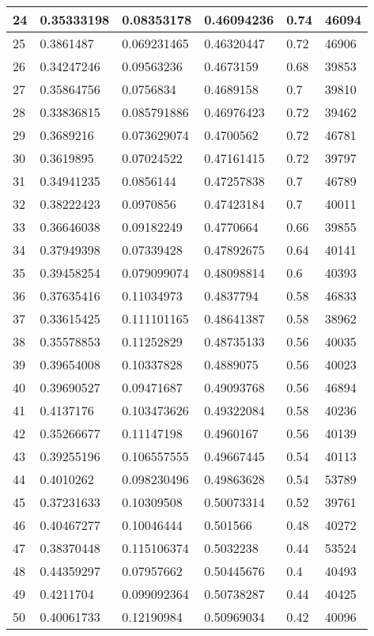 \begin{longtable}{|l|l|l|l|l|l|}
24 & 0.35333198 & 0.08353178 & 0.46094236 & 0.74 & 46094 \\ \hline 
25 & 0.3861487 & 0.069231465 & 0.46320447 & 0.72 & 46906 \\ \hline 
26 & 0.34247246 & 0.09563236 & 0.4673159 & 0.68 & 39853 \\ \hline 
27 & 0.35864756 & 0.0756834 & 0.4689158 & 0.7 & 39810 \\ \hline 
28 & 0.33836815 & 0.085791886 & 0.46976423 & 0.72 & 39462 \\ \hline 
29 & 0.3689216 & 0.073629074 & 0.4700562 & 0.72 & 46781 \\ \hline 
30 & 0.3619895 & 0.07024522 & 0.47161415 & 0.72 & 39797 \\ \hline 
31 & 0.34941235 & 0.0856144 & 0.47257838 & 0.7 & 46789 \\ \hline 
32 & 0.38222423 & 0.0970856 & 0.47423184 & 0.7 & 40011 \\ \hline 
33 & 0.36646038 & 0.09182249 & 0.4770664 & 0.66 & 39855 \\ \hline 
34 & 0.37949398 & 0.07339428 & 0.47892675 & 0.64 & 40141 \\ \hline 
35 & 0.39458254 & 0.079099074 & 0.48098814 & 0.6 & 40393 \\ \hline 
36 & 0.37635416 & 0.11034973 & 0.4837794 & 0.58 & 46833 \\ \hline 
37 & 0.33615425 & 0.111101165 & 0.48641387 & 0.58 & 38962 \\ \hline 
38 & 0.35578853 & 0.11252829 & 0.48735133 & 0.56 & 40035 \\ \hline 
39 & 0.39654008 & 0.10337828 & 0.4889075 & 0.56 & 40023 \\ \hline 
40 & 0.39690527 & 0.09471687 & 0.49093768 & 0.56 & 46894 \\ \hline 
41 & 0.4137176 & 0.103473626 & 0.49322084 & 0.58 & 40236 \\ \hline 
42 & 0.35266677 & 0.11147198 & 0.4960167 & 0.56 & 40139 \\ \hline 
43 & 0.39255196 & 0.106557555 & 0.49667445 & 0.54 & 40113 \\ \hline 
44 & 0.4010262 & 0.098230496 & 0.49863628 & 0.54 & 53789 \\ \hline 
45 & 0.37231633 & 0.10309508 & 0.50073314 & 0.52 & 39761 \\ \hline 
46 & 0.40467277 & 0.10046444 & 0.501566 & 0.48 & 40272 \\ \hline 
47 & 0.38370448 & 0.115106374 & 0.5032238 & 0.44 & 53524 \\ \hline 
48 & 0.44359297 & 0.07957662 & 0.50445676 & 0.4 & 40493 \\ \hline 
49 & 0.4211704 & 0.099092364 & 0.50738287 & 0.44 & 40425 \\ \hline 
50 & 0.40061733 & 0.12190984 & 0.50969034 & 0.42 & 40096 \\ \hline 
\end{longtable}